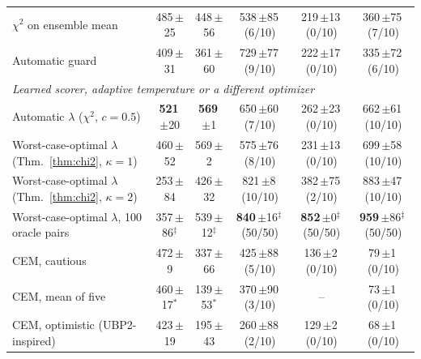\begin{table}[t]
\begin{tabular}{lccccc}
$\chi^2$ on ensemble mean & 485\,{\scriptsize$\pm$25} & 448\,{\scriptsize$\pm$56} & 538\,{\scriptsize$\pm$85}\,(6/10) & 219\,{\scriptsize$\pm$13}\,(0/10) & 360\,{\scriptsize$\pm$75}\,(7/10) \\
Automatic guard & 409\,{\scriptsize$\pm$31} & 361\,{\scriptsize$\pm$60} & 729\,{\scriptsize$\pm$77}\,(9/10) & 222\,{\scriptsize$\pm$17}\,(0/10) & 335\,{\scriptsize$\pm$72}\,(6/10) \\
\midrule
\multicolumn{6}{l}{\emph{Learned scorer, adaptive temperature or a different optimizer}} \\
Automatic $\lambda$ ($\chi^2$, $c=0.5$) & \textbf{521}\,{\scriptsize$\pm$20} & \textbf{569}\,{\scriptsize$\pm$1} & 650\,{\scriptsize$\pm$60}\,(7/10) & 262\,{\scriptsize$\pm$23}\,(0/10) & 662\,{\scriptsize$\pm$61}\,(10/10) \\
Worst-case-optimal $\lambda$ (Thm.~\ref{thm:chi2}, $\kappa=1$) & 460\,{\scriptsize$\pm$52} & 569\,{\scriptsize$\pm$2} & 575\,{\scriptsize$\pm$76}\,(8/10) & 231\,{\scriptsize$\pm$13}\,(0/10) & 699\,{\scriptsize$\pm$58}\,(10/10) \\
Worst-case-optimal $\lambda$ (Thm.~\ref{thm:chi2}, $\kappa=2$) & 253\,{\scriptsize$\pm$84} & 426\,{\scriptsize$\pm$32} & 821\,{\scriptsize$\pm$8}\,(10/10) & 382\,{\scriptsize$\pm$75}\,(2/10) & 883\,{\scriptsize$\pm$47}\,(10/10) \\
Worst-case-optimal $\lambda$, 100 oracle pairs & 357\,{\scriptsize$\pm$86}$^\ddagger$ & 539\,{\scriptsize$\pm$12}$^\ddagger$ & \textbf{840}\,{\scriptsize$\pm$16}$^\ddagger$\,(50/50) & \textbf{852}\,{\scriptsize$\pm$0}$^\ddagger$\,(50/50) & \textbf{959}\,{\scriptsize$\pm$86}$^\ddagger$\,(50/50) \\
CEM, cautious & 472\,{\scriptsize$\pm$9} & 337\,{\scriptsize$\pm$66} & 425\,{\scriptsize$\pm$88}\,(5/10) & 136\,{\scriptsize$\pm$2}\,(0/10) & 79\,{\scriptsize$\pm$1}\,(0/10) \\
CEM, mean of five & 460\,{\scriptsize$\pm$17}$^\ast$ & 139\,{\scriptsize$\pm$53}$^\ast$ & 370\,{\scriptsize$\pm$90}\,(3/10) & -- & 73\,{\scriptsize$\pm$1}\,(0/10) \\
CEM, optimistic (UBP2-inspired) & 423\,{\scriptsize$\pm$19} & 195\,{\scriptsize$\pm$43} & 260\,{\scriptsize$\pm$88}\,(2/10) & 129\,{\scriptsize$\pm$2}\,(0/10) & 68\,{\scriptsize$\pm$1}\,(0/10) \\
\bottomrule
\end{tabular}
\end{table}
